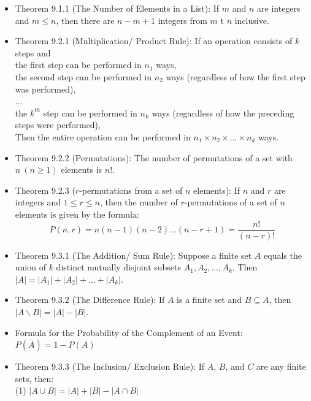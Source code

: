 \documentclass{article}
\begin{document}
\begin{itemize}
    \item Theorem 9.1.1 (The Number of Elements in a List): If $m$ and $n$ are integers and $m\leqslant n$, then there are $n-m+1$ integers from $m$ t $n$ inclusive.
    \item Theorem 9.2.1 (Multiplication/ Product Rule): If an operation consists of $k$ steps and
        \\ \hspace*{5mm} the first step can be performed in $n_1$ ways,
        \\ \hspace*{5mm} the second step can be performed in $n_2$ ways (regardless of how the first step was performed),
        \\ \hspace*{5mm} ...
        \\ \hspace*{5mm} the $k^{th}$ step can be performed in $n_k$ ways (regardless of how the preceding steps were performed),
        \\ Then the entire operation can be performed in $n_1\times n_2\times ...\times n_k$ ways.
    \item Theorem 9.2.2 (Permutations): The number of permutations of a set with $n\ (n\geqslant 1)$ elements is $n!$.
    \item Theorem 9.2.3 ($r$-permutations from a set of $n$ elements): If $n$ and $r$ are integers and $1\leqslant r\leqslant n$, then the number of $r$-permutations of a set of $n$ elements is given by the formula:
        \begin{equation*}
            P(n,r) = n(n-1)(n-2)...(n-r+1) = \frac{n!}{(n-r)!}
        \end{equation*}
    \item Theorem 9.3.1 (The Addition/ Sum Rule): Suppose a finite set $A$ equals the union of $k$ distinct mutually disjoint subsets $A_1,A_2,...,A_k$. Then $|A|=|A_1|+|A_2|+...+|A_k|$.
    \item Theorem 9.3.2 (The Difference Rule): If $A$ is a finite set and $B \subseteq A$, then $|A\backslash B|=|A|-|B|$.
    \item Formula for the Probability of the Complement of an Event: $P(\bar{A})=1-P(A)$
    \item Theorem 9.3.3 (The Inclusion/ Exclusion Rule): If $A$, $B$, and $C$ are any finite sets, then:
        \\ \hspace*{3mm} (1) $|A\cup B|=|A|+|B|-|A\cap B|$

\end{itemize}
\end{document}
